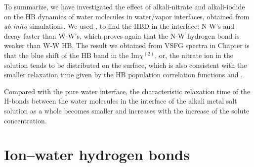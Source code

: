 To summarize, we have investigated the effect of alkali-nitrate and alkali-iodide on the HB dynamics
of water molecules in water/vapor interfaces, obtained from \emph{ab inito} simulations. 
We used \CHB, \SHB to find the HBD in the interface: N-W's \CHB and \SHB decay faster than W-W's, 
which proves again that the N-W hydrogen bond is weaker than W-W HB. 
The result we obtained from VSFG spectra in Chapter \label{CHAPTER_SFG_Calculation} is that the blue shift of the HB band in the Im$\chi^{(2)}$, 
or, the nitrate ion in the solution tends to be distributed on the surface, 
which is also consistent with the smaller relaxation time given by the HB population correlation functions \CHB and \SHB.

Compared with the pure water interface, the characteristic relaxation time of the H-bonds between the water molecules 
in the interface of the alkali metal salt solution as a whole becomes smaller and increases with the increase of the solute concentration.
\section{Ion--water hydrogen bonds}\label{PARA_ION-WAT}

